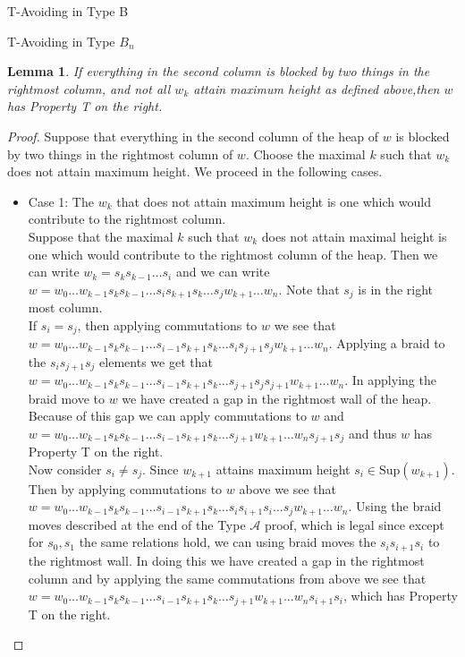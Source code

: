 \documentclass[11pt]{amsart}
\newtheorem{lemma}[theorem]{Lemma}
\theoremstyle{definition}
\numberwithin{equation}{section}
\newcommand{\A}{\mathcal{A}}
\renewcommand{\(}{\left(}
\renewcommand{\)}{\right)}
\newcommand{\Sup}{\textrm{Sup}}
\begin{document}
\begin{section}{T-Avoiding in Type B}
\begin{subsection}{T-Avoiding in Type $B_n$}
\begin{lemma}
If everything in the second column is blocked by two things in the rightmost column, and not all $w_k$ attain maximum height as defined above,then $w$ has Property T on the right.
\end{lemma}
\begin{proof}
Suppose that everything in the second column of the heap of $w$ is blocked by two things in the rightmost column of $w$. Choose the maximal $k$ such that $w_k$ does not attain maximum height. We proceed in the following cases.
	\begin{itemize}
	\item Case 1: The $w_k$ 	that does not attain maximum height is one which would contribute to the rightmost column.\\
		Suppose that the maximal $k$ such that $w_k$ does not attain maximal height is one which would contribute to the rightmost column of the heap. Then we can write $w_k=s_ks_{k-1} \ldots s_i$ and we can write $w=w_0 \ldots w_{k-1} s_k s_{k-1} \ldots s_i s_{k+1} s_k \ldots s_j w_{k+1} \ldots w_n$. Note that $s_j$ is in the right most column.\\
		 If $s_i=s_j$, then applying commutations to $w$ we see that $w=w_0 \ldots w_{k-1} s_k s_{k-1} \ldots s_{i-1} s_{k+1} s_k \ldots s_i s_{j+1} s_j w_{k+1} \ldots w_n$. Applying a braid to the $s_i s_{j+1} s_j$ elements we get that $w=w_0 \ldots w_{k-1} s_k s_{k-1} \ldots s_{i-1} s_{k+1} s_k \ldots s_{j+1} s_{j} s_{j+1} w_{k+1} \ldots w_n$. In applying the braid move to $w$ we have created a gap in the rightmost wall of the heap. Because of this gap we can apply commutations to $w$ and $w=w_0 \ldots w_{k-1} s_k s_{k-1} \ldots s_{i-1} s_{k+1} s_k \ldots s_{j+1} w_{k+1} \ldots w_n s_{j+1} s_{j}$ and thus $w$ has Property T on the right.\\
		 Now consider $s_i \neq s_j$. Since $w_{k+1}$ attains maximum height $s_i \in \Sup(w_{k+1})$. Then by applying commutations to $w$ above we see that $w=w_0 \ldots w_{k-1} s_k s_{k-1} \ldots s_{i-1} s_{k+1} s_k \ldots s_i s_{i+1} s_i \ldots s_j w_{k+1} \ldots w_n$. Using the braid moves described at the end of the Type $\A$ proof, which is legal since except for $s_0, s_1$ the same relations hold, we can using braid moves the $s_i s_{i+1} s_i$ to the rightmost wall. In doing this we have created a gap in the rightmost column and by applying the same commutations from above we see that $w=w_0 \ldots w_{k-1} s_k s_{k-1} \ldots s_{i-1} s_{k+1} s_k \ldots s_{j+1} w_{k+1} \ldots w_n s_{i+1} s_{i}$, which has Property T on the right. 

\end{itemize}
\end{proof}
\end{subsection}
\end{section}
\end{document}
